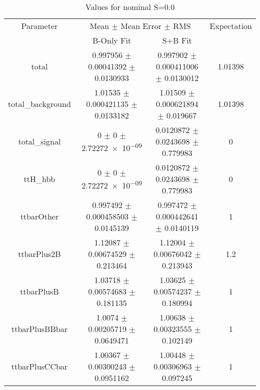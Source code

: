 \begin{table}
\centering
\caption{Values for nominal S=0.0}
\begin{tabular}{cccc}
\toprule
Parameter & \multicolumn{2}{c}{Mean $\pm$ Mean Error $\pm$ RMS} & Expectation\\
 & B-Only Fit & S+B Fit & \\
\midrule
total & \num{0.997956} $\pm$ \num{0.00041392} $\pm$ \num{0.0130933} & \num{0.997902} $\pm$ \num{0.000411006} $\pm$ \num{0.0130012} & \num{1.01398}\\
total\_background & \num{1.01535} $\pm$ \num{0.000421135} $\pm$ \num{0.0133182} & \num{1.01509} $\pm$ \num{0.000621894} $\pm$ \num{0.019667} & \num{1.01398}\\
total\_signal & \num{0} $\pm$ \num{0} $\pm$ \num{2.72272e-09} & \num{0.0120872} $\pm$ \num{0.0243698} $\pm$ \num{0.779983} & \num{0}\\
ttH\_hbb & \num{0} $\pm$ \num{0} $\pm$ \num{2.72272e-09} & \num{0.0120872} $\pm$ \num{0.0243698} $\pm$ \num{0.779983} & \num{0}\\
ttbarOther & \num{0.997492} $\pm$ \num{0.000458503} $\pm$ \num{0.0145139} & \num{0.997472} $\pm$ \num{0.000442641} $\pm$ \num{0.0140119} & \num{1}\\
ttbarPlus2B & \num{1.12087} $\pm$ \num{0.00674529} $\pm$ \num{0.213464} & \num{1.12004} $\pm$ \num{0.00676042} $\pm$ \num{0.213943} & \num{1.2}\\
ttbarPlusB & \num{1.03718} $\pm$ \num{0.00574683} $\pm$ \num{0.181135} & \num{1.03625} $\pm$ \num{0.00574237} $\pm$ \num{0.180994} & \num{1}\\
ttbarPlusBBbar & \num{1.0074} $\pm$ \num{0.00205719} $\pm$ \num{0.0649471} & \num{1.00638} $\pm$ \num{0.00323555} $\pm$ \num{0.102149} & \num{1}\\
ttbarPlusCCbar & \num{1.00367} $\pm$ \num{0.00300243} $\pm$ \num{0.0951162} & \num{1.00448} $\pm$ \num{0.00306963} $\pm$ \num{0.097245} & \num{1}\\
\bottomrule
\end{tabular}
\end{table}